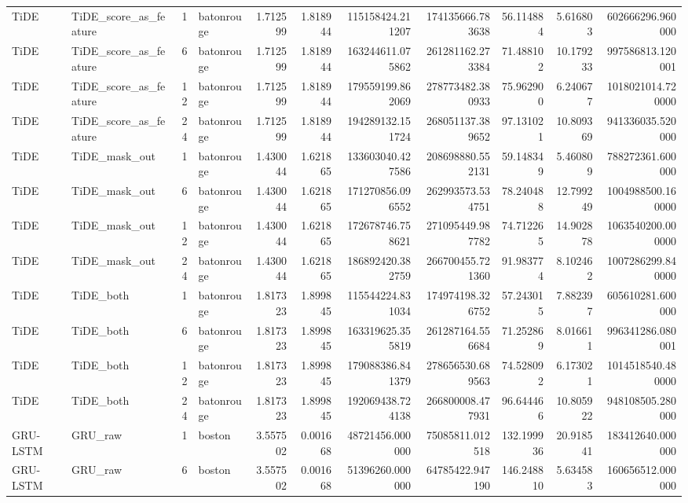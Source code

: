 \begin{longtable}{llrlrrrrrrr}
TiDE & TiDE\_score\_as\_feature & 1 & batonrouge & 1.712599 & 1.818944 & 115158424.211207 & 174135666.783638 & 56.114884 & 5.616803 & 602666296.960000 \\
TiDE & TiDE\_score\_as\_feature & 6 & batonrouge & 1.712599 & 1.818944 & 163244611.075862 & 261281162.273384 & 71.488102 & 10.179233 & 997586813.120001 \\
TiDE & TiDE\_score\_as\_feature & 12 & batonrouge & 1.712599 & 1.818944 & 179559199.862069 & 278773482.380933 & 75.962900 & 6.240677 & 1018021014.720000 \\
TiDE & TiDE\_score\_as\_feature & 24 & batonrouge & 1.712599 & 1.818944 & 194289132.151724 & 268051137.389652 & 97.131021 & 10.809369 & 941336035.520000 \\
TiDE & TiDE\_mask\_out & 1 & batonrouge & 1.430044 & 1.621865 & 133603040.427586 & 208698880.552131 & 59.148349 & 5.460809 & 788272361.600000 \\
TiDE & TiDE\_mask\_out & 6 & batonrouge & 1.430044 & 1.621865 & 171270856.096552 & 262993573.534751 & 78.240488 & 12.799249 & 1004988500.160000 \\
TiDE & TiDE\_mask\_out & 12 & batonrouge & 1.430044 & 1.621865 & 172678746.758621 & 271095449.987782 & 74.712265 & 14.902878 & 1063540200.000000 \\
TiDE & TiDE\_mask\_out & 24 & batonrouge & 1.430044 & 1.621865 & 186892420.382759 & 266700455.721360 & 91.983774 & 8.102462 & 1007286299.840000 \\
TiDE & TiDE\_both & 1 & batonrouge & 1.817323 & 1.899845 & 115544224.831034 & 174974198.326752 & 57.243015 & 7.882397 & 605610281.600000 \\
TiDE & TiDE\_both & 6 & batonrouge & 1.817323 & 1.899845 & 163319625.355819 & 261287164.556684 & 71.252869 & 8.016611 & 996341286.080001 \\
TiDE & TiDE\_both & 12 & batonrouge & 1.817323 & 1.899845 & 179088386.841379 & 278656530.689563 & 74.528092 & 6.173021 & 1014518540.480000 \\
TiDE & TiDE\_both & 24 & batonrouge & 1.817323 & 1.899845 & 192069438.724138 & 266800008.477931 & 96.644466 & 10.805922 & 948108505.280000 \\
GRU-LSTM & GRU\_raw & 1 & boston & 3.557502 & 0.001668 & 48721456.000000 & 75085811.012518 & 132.199936 & 20.918541 & 183412640.000000 \\
GRU-LSTM & GRU\_raw & 6 & boston & 3.557502 & 0.001668 & 51396260.000000 & 64785422.947190 & 146.248810 & 5.634583 & 160656512.000000 \\

\end{longtable}
